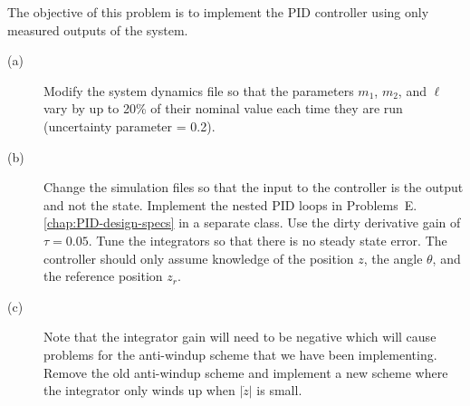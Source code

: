The objective of this problem is to implement the PID controller using only measured outputs of the system.
\begin{description}
\item[(a)]  Modify the system dynamics file so that the parameters $m_1$, $m_2$, and $\ell$ vary by up to 20\% of their nominal value each time they are run (uncertainty parameter = 0.2).
\item[(b)]  Change the simulation files so that the input to the controller is the output and not the state.  Implement the nested PID loops in Problems~E.\ref{chap:PID-design-specs} in a separate class.    Use the dirty derivative gain of $\tau=0.05$.  Tune the integrators so that there is no steady state error. The controller should only assume knowledge of the position $z$, the angle $\theta$, and the reference position $z_r$.
\item[(c)]  Note that the integrator gain will need to be negative which will cause problems for the anti-windup scheme that we have been implementing.  Remove the old anti-windup scheme and implement a new scheme where the integrator only winds up when $|\dot{z}|$ is small. 
\end{description}
